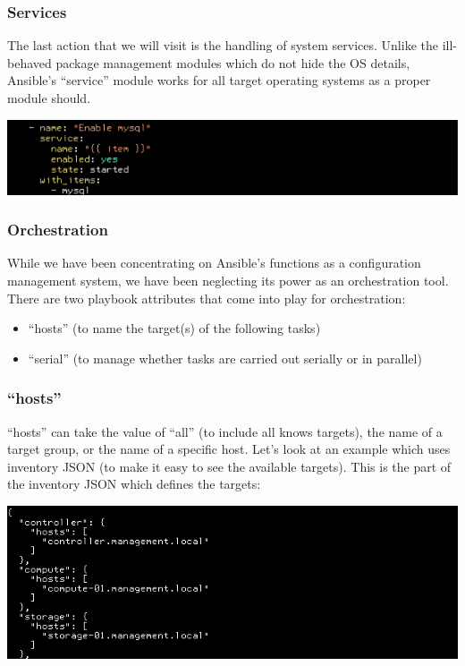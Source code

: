 \documentclass[helvetica,english,utf8,notitle,nologo]{beamer}
\begin{document}
\begin{frame}
  \frametitle{Services}

  The last action that we will visit is the handling of system
  services. Unlike the ill-behaved package management modules which do
  not hide the OS details, Ansible's ``service'' module works for all
  target operating systems as a proper module should.

  \includegraphics[scale=0.44]{img_25}
\end{frame}

\begin{frame}
  \frametitle{Orchestration}

  While we have been concentrating on Ansible's functions as a
  configuration management system, we have been neglecting its power
  as an orchestration tool. There are two playbook attributes that
  come into play for orchestration:

  \begin{itemize}
  \item ``hosts'' (to name the target(s) of the following tasks)
  \item ``serial'' (to manage whether tasks are carried out serially
    or in parallel)
  \end{itemize}
\end{frame}

\begin{frame}
  \frametitle{``hosts''}

  ``hosts'' can take the value of ``all'' (to include all knows
  targets), the name of a target group, or the name of a specific
  host. Let's look at an example which uses inventory JSON (to make
  it easy to see the available targets). This is the part of the
  inventory JSON which defines the targets:

  \includegraphics[scale=0.44]{img_28}
\end{frame}
\end{document}
